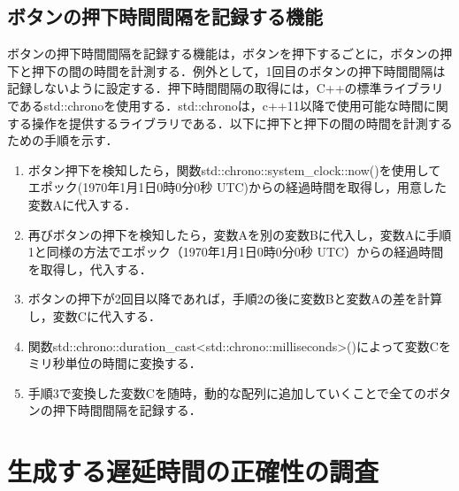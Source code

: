 \subsection{ボタンの押下時間間隔を記録する機能}
ボタンの押下時間間隔を記録する機能は，ボタンを押下するごとに，ボタンの押下と押下の間の時間を計測する．例外として，1回目のボタンの押下時間間隔は記録しないように設定する．押下時間間隔の取得には，C++の標準ライブラリであるstd::chronoを使用する．std::chronoは，c++11以降で使用可能な時間に関する操作を提供するライブラリである．以下に押下と押下の間の時間を計測するための手順を示す．
\begin{enumerate}[leftmargin=*]
\item ボタン押下を検知したら，関数std::chrono::system\_clock::now()を使用してエポック(1970年1月1日0時0分0秒 UTC)からの経過時間を取得し，用意した変数Aに代入する．
\item 再びボタンの押下を検知したら，変数Aを別の変数Bに代入し，変数Aに手順1と同様の方法でエポック（1970年1月1日0時0分0秒 UTC）からの経過時間を取得し，代入する．
\item ボタンの押下が2回目以降であれば，手順2の後に変数Bと変数Aの差を計算し，変数Cに代入する．
\item 関数std::chrono::duration\_cast\textless std::chrono::milliseconds\textgreater()によって変数Cをミリ秒単位の時間に変換する．
\item 手順3で変換した変数Cを随時，動的な配列に追加していくことで全てのボタンの押下時間間隔を記録する．
\end{enumerate}
\section{生成する遅延時間の正確性の調査}
